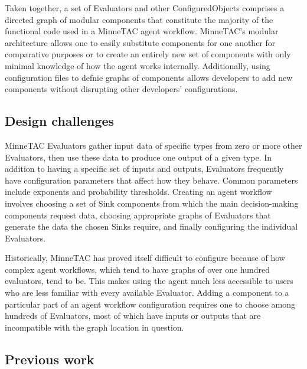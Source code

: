 \documentclass{elsart}
\begin{document}
Taken together, a set of Evaluators and other ConfiguredObjects comprises
a directed graph of modular components that constitute the majority
of the functional code used in a MinneTAC agent workflow.  MinneTAC's
modular architecture allows one to easily substitute components for one
another for comparative purposes or to create an entirely new set of
components with only minimal knowledge of how the agent works internally.
Additionally, using configuration files to defnie graphs of components
allows developers to add new components without disrupting other
developers' configurations.

\subsection{Design challenges}

MinneTAC Evaluators gather input data of specific types from zero or
more other Evaluators, then use these data to produce one output of a
given type.  In addition to having a specific set of inputs and outputs,
Evaluators frequently have configuration parameters that affect how they
behave.  Common parameters include exponents and probability thresholds.
Creating an agent workflow involves choosing a set of Sink components
from which the main decision-making components request data, choosing
appropriate graphs of Evaluators that generate the data the chosen Sinks
require, and finally configuring the individual Evaluators.

Historically, MinneTAC has proved itself difficult to configure because of
how complex agent workflows, which tend to have graphs of over one hundred
evaluators, tend to be.  This makes using the agent much less accessible
to users who are less familiar with every available Evaluator.  Adding a
component to a particular part of an agent workflow configuration requires
one to choose among hundreds of Evaluators, most of which have inputs
or outputs that are incompatible with the graph location in question.

\subsection{Previous work}
\end{document}
